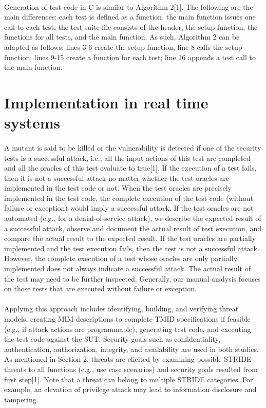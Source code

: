 \paragraph{}
Generation of test code in C is similar to Algorithm 2[1].
The following are the main differences: each test is defined
as a function, the main function issues one call to each test,
the test suite file consists of the header, the setup function,
the functions for all tests, and the main function. As such,
Algorithm 2 can be adapted as follows: lines 3-6 create the
setup function, line 8 calls the setup function; lines 9-15
create a function for each test; line 16 appends a test call to
the main function.
\newpage
\section{\textbf{\Large Implementation in real time systems}}

\paragraph*{}
A mutant is said to be killed or the vulnerability is detected if
one of the security tests is a successful attack, i.e., all the input
actions of this test are completed and all the oracles of this
test evaluate to true[1]. If the execution of a test fails, then it is
not a successful attack no matter whether the test oracles are
implemented in the test code or not. When the test oracles
are precisely implemented in the test code, the complete
execution of the test code (without failure or exception)
would imply a successful attack. If the test oracles are not
automated (e.g., for a denial-of-service attack), we describe
the expected result of a successful attack, observe and
document the actual result of test execution, and compare the
actual result to the expected result. If the test oracles are
partially implemented and the test execution fails, then
the test is not a successful attack. However, the complete
execution of a test whose oracles are only partially
implemented does not always indicate a successful attack.
The actual result of the test may need to be further inspected.
Generally, our manual analysis focuses on those tests that are
executed without failure or exception.
\paragraph*{}
Applying this approach includes identifying, building, and verifying threat
models, creating MIM descriptions to complete TMID specifications if feasible (e.g., if attack actions are programmable), generating test code, and executing the test code against the SUT. Security goals such as confidentiality,
authentication, authorization, integrity, and availability are
used in both studies. As mentioned in Section 2, threats are
elicited by examining possible STRIDE threats to all functions
(e.g., use case scenarios) and security goals resulted
from first step[1]. Note that a threat can belong to multiple STRIDE
categories. For example, an elevation of privilege attack may
lead to information disclosure and tampering.
